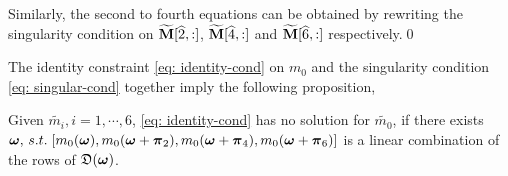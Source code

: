 Similarly, the second to fourth equations can be obtained by rewriting the singularity condition on $\widetilde{\mathbf{M}}[\widehat{2},:]$, $\widetilde{\mathbf{M}}[\widehat{4},:]$ and $\widetilde{\mathbf{M}}[\widehat{6},:]$ respectively.\qed

The identity constraint \eqref{eq: identity-cond} on $m_0$ and the singularity condition \eqref{eq: singular-cond} together imply the following proposition,
\begin{proposition}\label{prop: feasibility}
Given $\widetilde{m_i}, i = 1,\cdots,6$, \eqref{eq: identity-cond} has no solution for $\widetilde{m_0}$, if there exists $\boldsymbol{\omega}, \,s.t. \; [m_0(\boldsymbol{\omega}), m_0(\boldsymbol{\omega}+\boldsymbol{\pi}_2),m_0(\boldsymbol{\omega}+\boldsymbol{\pi}_4),m_0(\boldsymbol{\omega}+\boldsymbol{\pi}_6)]$ is a linear combination of the rows of $\mathfrak{D}(\boldsymbol{\omega})$.%
\end{proposition}


